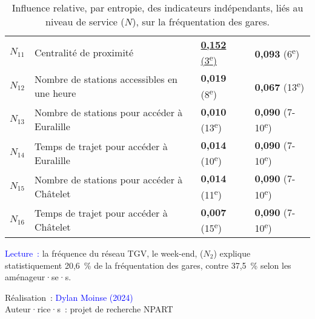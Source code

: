 \begin{table}[h!]
{\begin{tabular}{p{}p{}p{}p{}}
\small{\(N_{11}\)} & \small{Centralité de proximité} & \underline{\small{\textbf{0,152}} (3\textsuperscript{e})} & \small{\textbf{0,093} (6\textsuperscript{e})}\\
\small{\(N_{12}\)} & \small{Nombre de stations accessibles en une heure} & \small{\textbf{0,019} (8\textsuperscript{e})} & \small{\textbf{0,067} (13\textsuperscript{e})}\\
\small{\(N_{13}\)} & \small{Nombre de stations pour accéder à Euralille} & \small{\textbf{0,010} (13\textsuperscript{e})} & \small{\textbf{0,090} (7-10\textsuperscript{e})}\\
\small{\(N_{14}\)} & \small{Temps de trajet pour accéder à Euralille} & \small{\textbf{0,014} (10\textsuperscript{e})} & \small{\textbf{0,090} (7-10\textsuperscript{e})}\\
\small{\(N_{15}\)} & \small{Nombre de stations pour accéder à Châtelet} & \small{\textbf{0,014} (11\textsuperscript{e})} & \small{\textbf{0,090} (7-10\textsuperscript{e})}\\
\small{\(N_{16}\)} & \small{Temps de trajet pour accéder à Châtelet} & \small{\textbf{0,007} (15\textsuperscript{e})} & \small{\textbf{0,090} (7-10\textsuperscript{e})}\\
        \hline
        \end{tabular}}
    \caption{Influence relative, par entropie, des indicateurs indépendants, liés au niveau de service (\(N\)), sur la fréquentation des gares.}
    \label{table-chap6:influence-indicateurs-node}
        \vspace{5pt}
        \begin{flushleft}\scriptsize{
        \textcolor{blue}{Lecture~:} la fréquence du réseau \acrshort{TGV}, le week-end, (\(N_{2}\)) explique statistiquement 20,6~\% de la fréquentation des gares, contre 37,5~\% selon les aménageur·se·s.
        }\end{flushleft}
        \begin{flushright}\scriptsize{
        Réalisation~: \textcolor{blue}{Dylan Moinse (2024)}
        \\
        Auteur·rice·s~: projet de recherche \acrshort{NPART}
        }\end{flushright}
        \end{table}